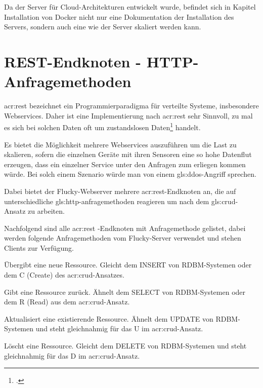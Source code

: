Da der Server für Cloud-Architekturen entwickelt wurde, befindet sich in Kapitel
Installation von Docker nicht nur eine Dokumentation der Installation des
Servers, sondern auch eine wie der Server skaliert werden kann.

\section{REST-Endknoten - HTTP-Anfragemethoden}%
\label{sec:rest}

\acrfull{acr:rest} bezeichnet ein Programmierparadigma für verteilte Systeme,
insbesondere Webservices. Daher ist eine Implementierung nach
\acrshort{acr:rest} sehr Sinnvoll, zu mal es sich bei solchen Daten oft um
zustandslosen Daten\footcite{zustandslosigkeit} handelt.

Es bietet die Möglichkeit mehrere Webservices auszuführen um die Last zu
skalieren, sofern die einzelnen Geräte mit ihren Sensoren eine so hohe Datenflut
erzeugen, dass ein einzelner Service unter den Anfragen zum erliegen kommen
würde. Bei solch einem Szenario würde man von einem \Gls{gls:ddos}-Angriff
sprechen.

Dabei bietet der Flucky-Webserver mehrere \acrshort{acr:rest}-Endknoten an, die
auf unterschiedliche \Gls{gls:http-anfragemethoden} reagieren um nach dem
\Gls{gls:crud}-Ansatz zu arbeiten.

Nachfolgend sind alle \acrshort{acr:rest} -Endknoten mit Anfragemethode
gelistet, dabei werden folgende Anfragemethoden vom Flucky-Server verwendet und
stehen Clients zur Verfügung.

\begin{description}[itemsep=0pt]
  \item[POST] Übergibt eine neue Ressource. Gleicht dem INSERT von RDBM-Systemen oder dem C (Create) des \acrshort{acr:crud}-Ansatzes.
  \item[GET] Gibt eine Ressource zurück. Ähnelt dem SELECT von RDBM-Systemen oder dem R (Read) aus dem \acrshort{acr:crud}-Ansatz.
  \item[PUT] Aktualisiert eine existierende Ressource. Ähnelt dem UPDATE von RDBM-Systemen und steht gleichnahmig für das U im \acrshort{acr:crud}-Ansatz.
  \item[DELETE] Löscht eine Ressource. Gleicht dem DELETE von RDBM-Systemen und steht gleichnahmig für das D im \acrshort{acr:crud}-Ansatz.
\end{description}

